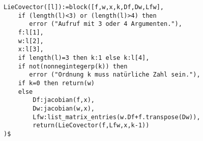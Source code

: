 \noindent
\begin{minipage}[t]{\textwidth}
\color{blue}
\begin{verbatim}
LieCovector([l]):=block([f,w,x,k,Df,Dw,Lfw],
    if (length(l)<3) or (length(l)>4) then 
       error ("Aufruf mit 3 oder 4 Argumenten."),
    f:l[1],
    w:l[2],
    x:l[3],
    if length(l)=3 then k:1 else k:l[4],
    if not(nonnegintegerp(k)) then 
       error ("Ordnung k muss natürliche Zahl sein."),
    if k=0 then return(w)
    else 
        Df:jacobian(f,x),
        Dw:jacobian(w,x),
        Lfw:list_matrix_entries(w.Df+f.transpose(Dw)),
        return(LieCovector(f,Lfw,x,k-1))
)$
\end{verbatim}
\end{minipage}
